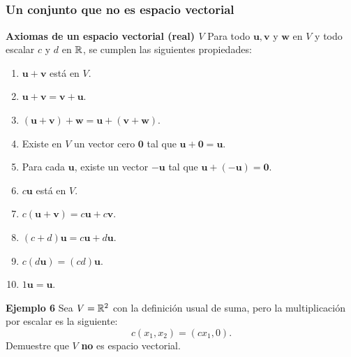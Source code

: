 
\subsection{}

{\nologo
\begin{frame}\frametitle{Un conjunto que no es espacio vectorial}

\begin{block}{\textbf{Axiomas de un espacio vectorial (real) $V$}}	
	\justifying
	Para todo $\mathbf{u}, \mathbf{v}$ y $\mathbf{w}$ en $V$ y todo escalar $c$ y $d$ en $\mathbb{R}$, se 
	cumplen las siguientes propiedades: 
	
	\vspace{-3mm}
	\begin{multicols}{2}		
		\begin{enumerate}			
			\justifying
			\item $\mathbf{u}+\mathbf{v}$ está en $V$. %
			\item $\mathbf{u}+\mathbf{v} = \mathbf{v}+\mathbf{u}$. %
			\item $(\mathbf{u}+\mathbf{v})+\mathbf{w} = \mathbf{u}+(\mathbf{v}+\mathbf{w})$. %
			\item Existe en $V$ un vector cero $\mathbf{0}$ tal que $\mathbf{u}+\mathbf{0} = \mathbf{u}$.		
			\item Para cada $\mathbf{u}$, existe un vector $-\mathbf{u}$ tal que
			$ \mathbf{u}+(-\mathbf{u}) = \mathbf{0}$.
			\columnbreak
			\item $c\mathbf{u}$ está en $V$. 
			\item $c(\mathbf{u}+\mathbf{v}) = c\mathbf{u} + c\mathbf{v}$.
			\item $(c+d)\mathbf{u} = c\mathbf{u} + d\mathbf{u}$.
			\item $c(d\mathbf{u}) = (cd)\mathbf{u}$.
			\item $1\mathbf{u} = \mathbf{u}$.
		\end{enumerate}		
	\end{multicols}
	
	\vspace{-2mm}
\end{block}

\begin{ej}{\textbf{Ejemplo 6}}\justifying
	Sea $V=\mathbb{R}^2$ con la definición usual de suma, pero la multiplicación por escalar es la siguiente:
	\[
		c(x_1,x_2) = (cx_1,0).
	\]
	Demuestre que $V$ \textbf{no} es espacio vectorial.
\end{ej}

\end{frame}
}

